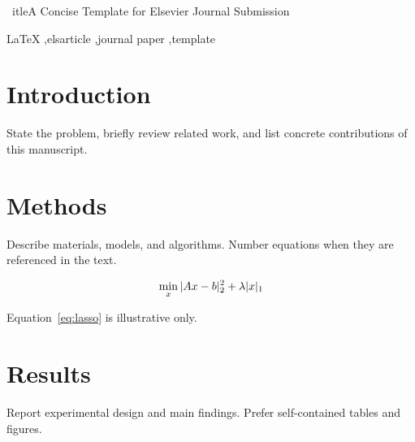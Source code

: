 \documentclass[preprint,12pt]{elsarticle}
\begin{document}
\begin{frontmatter}

\	itle{A Concise Template for Elsevier Journal Submission}

\author[aff1]{First A. Author}

\author[aff1,aff2]{Second B. Author}


\address[aff1]{Department of Computer Science, University Name, City, Country}
\address[aff2]{Research Institute, Organization Name, City, Country}

\begin{abstract}
This skeleton demonstrates the structure of an Elsevier manuscript using the \	exttt{elsarticle} class. Replace sample sections with your content and adjust bibliography style according to the journal guide for authors.
\end{abstract}

\begin{keyword}
LaTeX \sep elsarticle \sep journal paper \sep template
\end{keyword}

\end{frontmatter}

\section{Introduction}
State the problem, briefly review related work, and list concrete contributions of this manuscript.

\section{Methods}
Describe materials, models, and algorithms. Number equations when they are referenced in the text.

\begin{equation}
\min_{x} \\|Ax - b\\|_2^2 + \lambda \\|x\\|_1
\label{eq:lasso}
\end{equation}

Equation~\eqref{eq:lasso} is illustrative only.

\section{Results}
Report experimental design and main findings. Prefer self-contained tables and figures.
\end{document}
